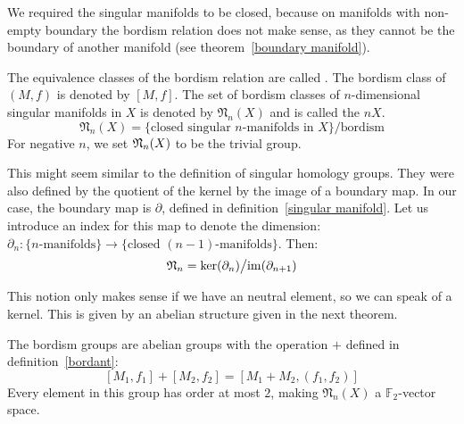 \documentclass[a4paper,11pt]{article}
\begin{document}
\begin{remark}
    We required the singular manifolds to be closed, because on manifolds with non-empty boundary the bordism relation does not make sense, as they cannot be the boundary of another manifold (see theorem\ \ref{boundary manifold}).
\end{remark}

\begin{definition}
    The equivalence classes of the bordism relation are called . 
    The bordism class of \((M,f)\) is denoted by \([M,f]\). 
    The set of bordism classes of \(n\)-dimensional singular manifolds in \(X\) is denoted by \(\mathfrak{N}_n(X)\) and is called the \(n\)\(X\).
    \[\mathfrak{N}_n(X)=\{\text{closed singular \(n\)-manifolds in \(X\)}\}\big/\text{bordism}\]
    For negative \(n\), we set \(\mathfrak{N}_n(X)\) to be the trivial group.
\end{definition}

\begin{observation}
    This might seem similar to the definition of singular homology groups. They were also defined by the quotient of the kernel by the image of a boundary map.
    In our case, the boundary map is \(\partial\), defined in definition\ \ref{singular manifold}. Let us introduce an index for this map to denote the dimension: \(\partial_n:\{n\text{-manifolds}\}\to\{\text{closed }(n-1)\text{-manifolds}\}\).
    Then: \[\mathfrak{N}_n=\ker(\partial_n)\big/\mathrm{im}(\partial_{n+1})\]
\end{observation}

This notion only makes sense if we have an neutral element, so we can speak of a kernel. This is given by an abelian structure given in the next theorem. 

\begin{theorem}\label{group structure}
    The bordism groups are abelian groups with the operation \(+\) defined in definition\ \ref{bordant}:
    \[[M_1,f_1]+[M_2,f_2]=[M_1+M_2,(f_1,f_2)]\]
    Every element in this group has order at most \(2\), making \(\mathfrak{N}_n(X)\) a \(\mathbb{F}_2\)-vector space.
\end{theorem}
\end{document}
